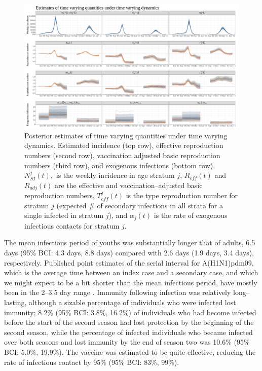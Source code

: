 \begin{figure}
	\centering
	\includegraphics[width=0.95\linewidth]{figures/flu_rw_ode_timevarying_plots}
	\caption{Posterior estimates of time varying quantities under time varying dynamics. Estimated incidence (top row), effective reproduction numbers (second row), vaccination adjusted basic reproduction numbers (third row), and exogenous infections (bottom row). $ N_{SI}^j(t), $ is the weekly incidence in age stratum $ j $, $ R_{eff}(t) $ and $ R_{adj}(t) $ are the effective and vaccination--adjusted basic reproduction numbers, $ T_{eff}^j(t) $ is the type reproduction number for stratum $ j $ (expected \# of secondary infections in all strata for a single infected in stratum $ j $), and $ \alpha_j(t) $ is the rate of exogenous infectious contacts for stratum $ j $.}
	\label{fig:flurwodetimevaryingplots}
\end{figure}

The mean infectious period of youths was substantially longer that of adults, 6.5 days (95\% BCI: 4.3 days, 8.8 days) compared with 2.6 days (1.9 days, 3.4 days), respectively. Published point estimates of the serial interval for A(H1N1)pdm09, which is the average time between an index case and a secondary case, and which we might expect to be a bit shorter than the mean infectious period, have mostly been in the 2--3.5 day range \cite{vink2014serial}. Immunity following infection was relatively long--lasting, although a sizable percentage of individuals who were infected lost immunity; 8.2\% (95\% BCI: 3.8\%, 16.2\%) of individuals who had become infected before the start of the second season had lost protection by the beginning of the second season, while the percentage of infected individuals who became infected over both seasons and lost immunity by the end of season two was 10.6\% (95\% BCI: 5.0\%, 19.9\%). The vaccine was estimated to be quite effective,  reducing the rate of infectious contact by 95\% (95\% BCI: 83\%, 99\%). 

